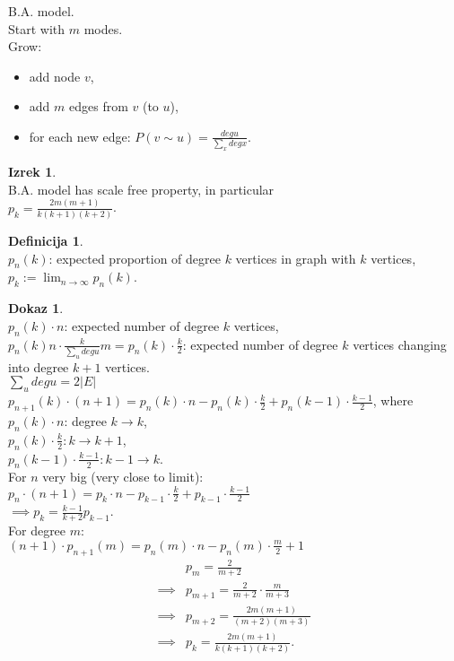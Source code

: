 \documentclass[a4paper, 12pt]{book}
\theoremstyle{definition}
\newtheorem{defn}[counter]{Definicija}
\newtheorem{theorem}[counter]{Izrek}
\newtheorem{pro}[counter]{Dokaz}
\theoremstyle{remark}
\begin{document}
B.A. model. \\
Start with $m$ modes. \\
Grow:
\begin{itemize}
  \item add node $v$,
  \item add $m$ edges from $v$ (to $u$),
  \item for each new edge: $P(v \sim u) = \frac{deg u}{\sum_x deg x}$.
\end{itemize}
\begin{theorem} \text{} \\
  B.A. model has scale free property, in particular \\
  $p_k = \frac{2 m (m+1)}{k (k+1) (k+2)}$.
\end{theorem}
\begin{defn} \text{} \\
  $p_n(k)$: expected proportion of degree $k$ vertices in graph with $k$ vertices, \\
  $p_k := \lim_{n \to \infty} p_n(k)$.
\end{defn}
\begin{pro} \text{} \\
  $p_n(k) \cdot n$: expected number of degree $k$ vertices, \\
  $p_n(k) n \cdot \frac{k}{\sum_u deg u} m = p_n(k) \cdot \frac{k}{2}$:
    expected number of degree $k$ vertices changing into degree $k+1$ vertices. \\
  $\sum_u deg u = 2 |E|$ \\
  $p_{n+1}(k) \cdot (n+1) = p_n(k) \cdot n - p_n(k) \cdot \frac{k}{2} + p_n(k-1) \cdot \frac{k-1}{2}$, where \\
  $p_n(k) \cdot n$: degree $k \to k$, \\
  $p_n(k) \cdot \frac{k}{2}: k \to k+1$, \\
  $p_n(k-1) \cdot \frac{k-1}{2}: k-1 \to k$. \\
  For $n$ very big (very close to limit): \\
  $p_n \cdot (n+1) = p_k \cdot n - p_{k-1} \cdot \frac{k}{2} + p_{k-1} \cdot \frac{k-1}{2}$ \\
  $\implies p_k = \frac{k-1}{k+2} p_{k-1}$. \\
  For degree $m$: \\
  $(n+1) \cdot p_{n+1}(m) = p_n(m) \cdot n - p_n(m) \cdot \frac{m}{2} + 1$ %
  \begin{align*}
    &p_m = \frac{2}{m+2} \\
    \implies &p_{m+1} = \frac{2}{m+2} \cdot \frac{m}{m+3} \\
    \implies &p_{m+2} = \frac{2m(m+1)}{(m+2)(m+3)} \\
    \implies &p_k = \frac{2m(m+1)}{k(k+1)(k+2)}.
  \end{align*}
\end{pro}
\end{document}
